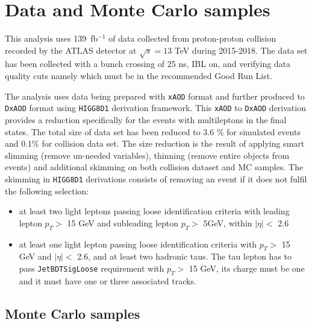 \section{Data and Monte Carlo samples}
\label{sec:dataset}
This analysis uses 139~fb$^{-1}$ of data collected from proton-proton collision recorded by the ATLAS 
detector at $\sqrt{s}=13$ TeV during 2015-2018. The data set has been collected with a 
bunch crossing of 25 ns, IBL on, and verifying data quality cuts namely which must be in the
recommended Good Run List.

The analysis uses data being prepared with \verb|xAOD| format and further produced to \verb|DxAOD| 
format using \verb|HIGG8D1| derivation framework. This \verb|xAOD| to \verb|DxAOD| derivation 
provides a reduction specifically for the \tth events with multileptons in the final states. 
The total size of data set has been reduced to 3.6 \% for simulated \ttbar 
events and 0.1\% for collision data set. The size reduction is the result of applying 
smart slimming (remove un-needed variables), thinning (remove entire objects from events) and 
additional skimming on both collision dataset and MC samples. The skimming in \verb|HIGG8D1| derivations consists of removing an event if 
it does not fulfil the following selection: 
\begin{itemize}
  \item at least two light leptons passing loose identification criteria with leading lepton $p_{T}>$ 15 GeV and subleading
  lepton $p_{T}>$ 5GeV, within $|\eta|<$ 2.6
  \item at least one light lepton passing loose identification criteria with $p_{T}>$ 15 GeV and $|\eta|<$ 2.6, and at least
  two hadronic taus. The tau lepton has to pass \verb|JetBDTSigLoose| requirement with $p_{T}>$ 15 GeV, its charge must be
  one and it must have one or three associated tracks.
\end{itemize}

\subsection{Monte Carlo samples}
\label{subsec:ms}


